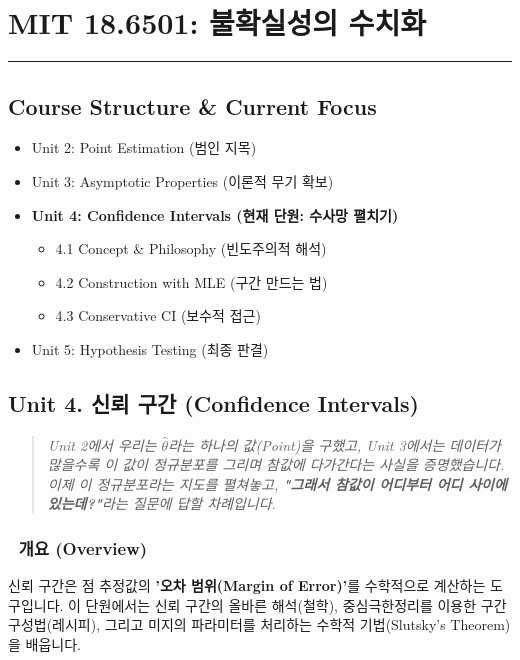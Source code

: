 \documentclass[11pt,a4paper]{book}
\theoremstyle{definition}
\begin{document}
\chapter{MIT 18.6501: 불확실성의 수치화}
\label{ch:lecture4}


\vspace{1cm}
\hrule
\vspace{1cm}

\section*{Course Structure \& Current Focus}
\begin{itemize}
    \item Unit 2: Point Estimation (범인 지목)
    \item Unit 3: Asymptotic Properties (이론적 무기 확보)
    \item \textbf{\textcolor{mainblue}{Unit 4: Confidence Intervals (현재 단원: 수사망 펼치기)}}
    \begin{itemize}
        \item 4.1 Concept \& Philosophy (빈도주의적 해석)
        \item 4.2 Construction with MLE (구간 만드는 법)
        \item 4.3 Conservative CI (보수적 접근)
    \end{itemize}
    \item Unit 5: Hypothesis Testing (최종 판결)
\end{itemize}


\section{Unit 4. 신뢰 구간 (Confidence Intervals)}

\begin{quote}
\textit{Unit 2에서 우리는 $\hat{\theta}$라는 하나의 값(Point)을 구했고, Unit 3에서는 데이터가 많을수록 이 값이 정규분포를 그리며 참값에 다가간다는 사실을 증명했습니다. 이제 이 정규분포라는 지도를 펼쳐놓고, \textbf{"그래서 참값이 어디부터 어디 사이에 있는데?"}라는 질문에 답할 차례입니다.}
\end{quote}

\subsection*{📌 개요 (Overview)}
신뢰 구간은 점 추정값의 \textbf{'오차 범위(Margin of Error)'}를 수학적으로 계산하는 도구입니다. 이 단원에서는 신뢰 구간의 올바른 해석(철학), 중심극한정리를 이용한 구간 구성법(레시피), 그리고 미지의 파라미터를 처리하는 수학적 기법(Slutsky's Theorem)을 배웁니다.
\end{document}

